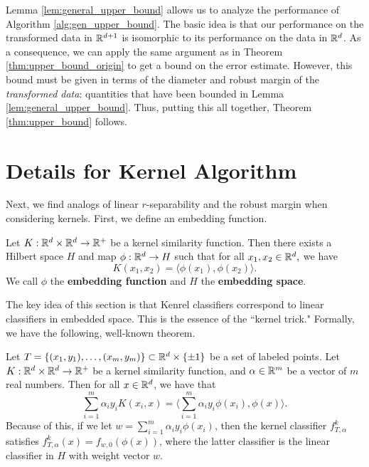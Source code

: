 Lemma \ref{lem:general_upper_bound} allows us to analyze the performance of Algorithm \ref{alg:gen_upper_bound}. The basic idea is that our performance on the transformed data in $\mathbb R^{d+1}$ is isomorphic to its performance on the data in $\mathbb R^d$. As a consequence, we can apply the same argument as in Theorem \ref{thm:upper_bound_origin} to get a bound on the error estimate. However, this bound must be given in terms of the diameter and robust margin of the \textit{transformed data}: quantities that have been bounded in Lemma \ref{lem:general_upper_bound}. Thus, putting this all together, Theorem \ref{thm:upper_bound} follows.


\section{Details for Kernel Algorithm}\label{sec:kernel_appendix}

Next, we find analogs of linear $r$-separability and the robust margin when considering kernels. First, we define an embedding function.

\begin{defn}\label{defn:embedding_function}
Let $K: \mathbb R^d \times \mathbb R^d \to \mathbb R^+$ be a kernel similarity function. Then there exists a Hilbert space $H$ and map $\phi: \mathbb R^d \to H$ such that for all $x_1, x_2 \in \mathbb R^d,$ we have $$K(x_1, x_2) = \langle \phi(x_1), \phi(x_2) \rangle.$$ We call $\phi$ the \textbf{embedding function} and $H$ the \textbf{embedding space}.
\end{defn}

The key idea of this section is that Kenrel classifiers correspond to linear classifiers in embedded space. This is the essence of the ``kernel trick." Formally, we have the following, well-known theorem. 

\begin{thm}\label{thm:kernel_trick}
Let $T = \{(x_1, y_1), \dots, (x_m, y_m)\} \subset \mathbb R^d \times \{\pm 1\}$ be a set of labeled points. Let $K:\mathbb R^d \times \mathbb R^d \to \mathbb R^+$ be a kernel similarity function, and $\alpha \in \mathbb R^m$ be a vector of $m$ real numbers. Then for all $x \in \mathbb R^d$, we have that $$\sum_{i = 1}^m \alpha_iy_iK(x_i, x) = \big \langle \sum_{i= 1}^m \alpha_iy_i\phi(x_i), \phi(x) \big \rangle.$$ Because of this, if we let $w = \sum_{i=1}^m \alpha_iy_i\phi(x_i)$, then the kernel classifier $f_{T, \alpha}^k$ satisfies $f_{T, \alpha}^k(x) = f_{w, 0}(\phi(x))$, where the latter classifier is the linear classifier in $H$ with weight vector $w$. 
\end{thm}

